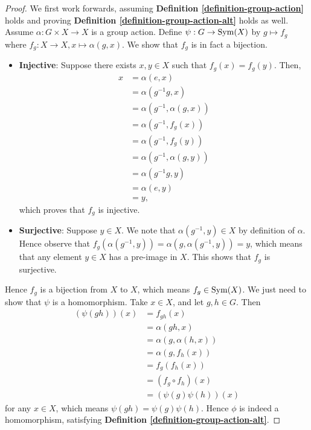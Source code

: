 \begin{proof}
    We first work forwards, assuming \textbf{Definition \ref{definition-group-action}} holds and proving \textbf{Definition \ref{definition-group-action-alt}} holds as well. Assume $\alpha: G \times X \to X$ is a group action. Define $\psi: G \to \mathrm{Sym}(X)$ by $g \mapsto f_g$ where $f_g: X \to X, x \mapsto \alpha(g, x)$. We show that $f_g$ is in fact a bijection.
    
    \newpage
    
    \begin{itemize}
        \item \textbf{Injective}: Suppose there exists $x, y \in X$ such that $f_g(x) = f_g(y)$. Then,
        \begin{align*}
            x &= \alpha(e, x)\\
            &= \alpha(g^{-1}g, x)\\
            &= \alpha(g^{-1}, \alpha(g, x))\\
            &= \alpha(g^{-1}, f_g(x))\\
            &= \alpha(g^{-1}, f_g(y))\\
            &= \alpha(g^{-1}, \alpha(g, y))\\
            &= \alpha(g^{-1}g, y)\\
            &= \alpha(e, y)\\
            &= y,
        \end{align*}
        which proves that $f_g$ is injective.
        \item \textbf{Surjective}: Suppose $y \in X$. We note that $\alpha(g^{-1}, y) \in X$ by definition of $\alpha$. Hence observe that $f_g(\alpha(g^{-1}, y)) = \alpha(g, \alpha(g^{-1}, y)) = y$, which means that any element $y \in X$ has a pre-image in $X$. This shows that $f_g$ is surjective.
    \end{itemize}
    Hence $f_g$ is a bijection from $X$ to $X$, which means $f_g \in \mathrm{Sym}(X)$. We just need to show that $\psi$ is a homomorphism. Take $x \in X$, and let $g, h \in G$. Then
    \begin{align*}
        (\psi(gh))(x) &= f_{gh}(x)\\
        &= \alpha(gh, x)\\
        &= \alpha(g, \alpha(h, x))\\
        &= \alpha(g, f_h(x))\\
        &= f_g(f_h(x))\\
        &= (f_g \circ f_h)(x)\\
        &= (\psi(g)\psi(h))(x)
    \end{align*}
    for any $x \in X$, which means $\psi(gh) = \psi(g)\psi(h)$. Hence $\phi$ is indeed a homomorphism, satisfying \textbf{Definition \ref{definition-group-action-alt}}.


\end{proof}
